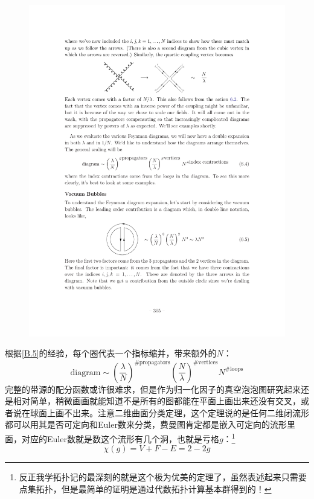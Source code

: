 \begin{figure}[H]
	\centering
	\includegraphics{figs/fig16.pdf}
\end{figure}
根据\ref{B.5}的经验，每个圈代表一个指标缩并，带来额外的$N$：
\begin{equation}
	\text{diagram}\sim\left(\frac{\lambda}{N}\right)^{\#\text{propagators}} \left( \frac { N }{ \lambda }\right)^{\#\text{vertices}}N ^ {\#\text{loops}}
\end{equation}
完整的带源的配分函数或许很难求，但是作为归一化因子的真空泡泡图研究起来还是相对简单，稍微画画就能知道不是所有的图都能在平面上画出来还没有交叉，或者说在球面上画不出来。注意二维曲面分类定理，这个定理说的是任何二维闭流形都可以用其是否可定向和Euler数来分类，费曼图肯定都是嵌入可定向的流形里面，对应的Euler数就是数这个流形有几个洞，也就是亏格$g$：\footnote{反正我学拓扑记的最深刻的就是这个极为优美的定理了，虽然表述起来只需要点集拓扑，但是最简单的证明是通过代数拓扑计算基本群得到的！}
\begin{equation}
	\chi(g)=V+F-E=2-2g
\end{equation}
